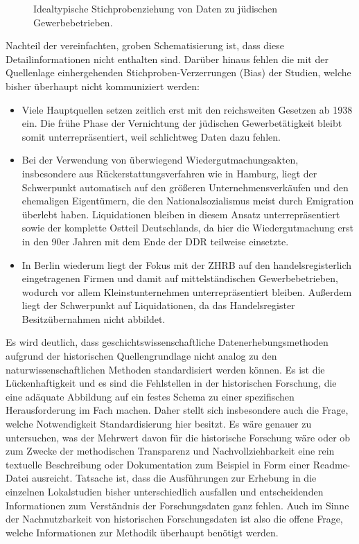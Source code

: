 \begin{figure}[h]
    \centering
    \caption{Idealtypische Stichprobenziehung von Daten zu jüdischen Gewerbebetrieben.}
    \label{fig:x cubed graph}
\end{figure}

Nachteil der vereinfachten, groben Schematisierung ist, dass diese Detailinformationen nicht enthalten sind. Darüber hinaus fehlen die mit der Quellenlage einhergehenden Stichproben-Verzerrungen (Bias) der Studien, welche bisher überhaupt nicht kommuniziert werden:

\begin{itemize}
    \item Viele Hauptquellen setzen zeitlich erst mit den reichsweiten Gesetzen ab 1938 ein. Die frühe Phase der Vernichtung der jüdischen Gewerbetätigkeit bleibt somit unterrepräsentiert, weil schlichtweg Daten dazu fehlen.
    \item Bei der Verwendung von überwiegend Wiedergutmachungsakten, insbesondere aus Rückerstattungsverfahren wie in Hamburg, liegt der Schwerpunkt automatisch auf den größeren Unternehmensverkäufen und den ehemaligen Eigentümern, die den Nationalsozialismus meist durch Emigration überlebt haben. Liquidationen bleiben in diesem Ansatz unterrepräsentiert sowie der komplette Ostteil Deutschlands, da hier die Wiedergutmachung erst in den 90er Jahren mit dem Ende der DDR teilweise einsetzte.
    \item In Berlin wiederum liegt der Fokus mit der ZHRB auf den handelsregisterlich eingetragenen Firmen und damit auf mittelständischen Gewerbebetrieben, wodurch vor allem Kleinstunternehmen unterrepräsentiert bleiben. Außerdem liegt der Schwerpunkt auf Liquidationen, da das Handelsregister Besitzübernahmen nicht abbildet.
\end{itemize}

Es wird deutlich, dass geschichtswissenschaftliche Datenerhebungsmethoden aufgrund der historischen Quellengrundlage nicht analog zu den naturwissenschaftlichen Methoden standardisiert werden können. Es ist die Lückenhaftigkeit und es sind die Fehlstellen in der historischen Forschung, die eine adäquate Abbildung auf ein festes Schema zu einer spezifischen Herausforderung im Fach machen. Daher stellt sich insbesondere auch die Frage, welche Notwendigkeit Standardisierung hier besitzt. Es wäre genauer zu untersuchen, was der Mehrwert davon für die historische Forschung wäre oder ob zum Zwecke der methodischen Transparenz und Nachvollziehbarkeit eine rein textuelle Beschreibung oder Dokumentation zum Beispiel in Form einer Readme-Datei ausreicht. Tatsache ist, dass die Ausführungen zur Erhebung in die einzelnen Lokalstudien bisher unterschiedlich ausfallen und entscheidenden Informationen zum Verständnis der Forschungsdaten ganz fehlen. Auch im Sinne der Nachnutzbarkeit von historischen Forschungsdaten ist also die offene Frage, welche Informationen zur Methodik überhaupt benötigt werden.

